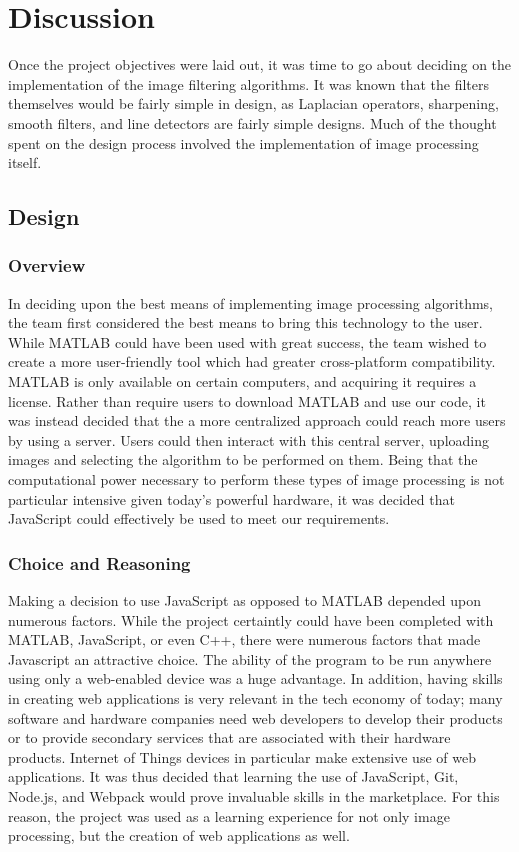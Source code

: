 \documentclass{article}
\let\Oldsection\section
\renewcommand{\section}{\FloatBarrier\Oldsection}
\let\Oldsubsection\subsection
\renewcommand{\subsection}{\FloatBarrier\Oldsubsection}
\let\Oldsubsubsection\subsubsection
\renewcommand{\subsubsection}{\FloatBarrier\Oldsubsubsection}
\begin{document}
  \newpage

  \section{Discussion}

  Once the project objectives were laid out, it was time to go about deciding on the implementation of the image filtering algorithms. It was known that the filters themselves would be fairly simple in design, as Laplacian operators, sharpening, smooth filters, and line detectors are fairly simple designs. Much of the thought spent on the design process involved the implementation of image processing itself.

  \subsection{Design}

  \subsubsection{Overview}

  In deciding upon the best means of implementing image processing algorithms, the team first considered the best means to bring this technology to the user. While MATLAB could have been used with great success, the team wished to create a more user-friendly tool which had greater cross-platform compatibility. MATLAB is only available on certain computers, and acquiring it requires a license. Rather than require users to download MATLAB and use our code, it was instead decided that the a more centralized approach could reach more users by using a server. Users could then interact with this central server, uploading images and selecting the algorithm to be performed on them. Being that the computational power necessary to perform these types of image processing is not particular intensive given today's powerful hardware, it was decided that JavaScript  could effectively be used to meet our requirements. 
  

  \subsubsection{Choice and Reasoning}

  Making a decision to use JavaScript as opposed to MATLAB depended upon numerous factors. While the project certaintly could have been completed with MATLAB, JavaScript, or even C++, there were numerous factors that made Javascript an attractive choice. The ability of the program to be run anywhere using only a web-enabled device was a huge advantage. In addition, having skills in creating web applications is very relevant in the tech economy of today; many software and hardware companies need web developers to develop their products or to provide secondary services that are associated with their hardware products. Internet of Things devices in particular make extensive use of web applications. It was thus decided that learning the use of JavaScript, Git, Node.js, and Webpack would prove invaluable skills in the marketplace. For this reason, the project was used as a learning experience for not only image processing, but the creation of web applications as well.
\end{document}
